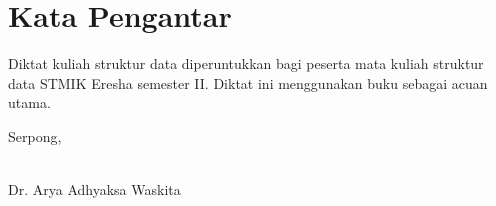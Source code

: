 \chapter*{Kata Pengantar}
Diktat kuliah struktur data diperuntukkan bagi peserta mata kuliah struktur data STMIK Eresha semester II. Diktat ini menggunakan buku \cite{group2005data} sebagai acuan utama.

\vspace*{0.1cm}
\begin{flushright}
Serpong, \date{}\\[0.1cm]
\vspace*{1cm}
Dr. Arya Adhyaksa Waskita

\end{flushright}
